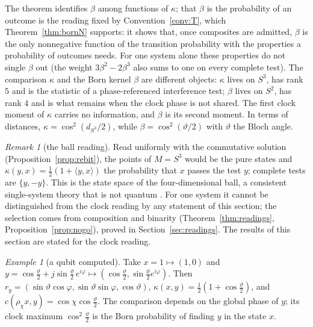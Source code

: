 \documentclass[aps,pra,onecolumn,superscriptaddress,nofootinbib,10pt]{revtex4-2}
\theoremstyle{definition}
\theoremstyle{remark}
\newtheorem{remark}[theorem]{Remark}
\newtheorem{example}[theorem]{Example}
\newcommand{\ip}[2]{\langle #1,#2\rangle}
\begin{document}
The theorem identifies $\beta$ among functions of $\kappa$; that $\beta$ is the probability of an
outcome is the reading fixed by Convention~\ref{conv:T}, which Theorem~\ref{thm:bornN} supports: it
shows that, once composites are admitted, $\beta$ is the only nonnegative function of the transition
probability with the properties a probability of outcomes needs.  For one system alone these properties do not single $\beta$ out (the weight
$3\beta^2-2\beta^3$ also sums to one on every complete test).  The comparison $\kappa$ and the Born
kernel $\beta$ are different objects: $\kappa$ lives on $S^3$, has
rank $5$ and is the statistic of a phase-referenced interference test; $\beta$ lives on $S^2$, has
rank $4$ and is what remains when the clock phase is not shared.  The first clock moment of $\kappa$
carries no information, and $\beta$ is its second moment.  In terms of distances,
$\kappa=\cos^2(d_{S^3}/2)$, while $\beta=\cos^2(\vartheta/2)$ with $\vartheta$ the Bloch angle.

\begin{remark}[the ball reading]\label{rem:ball}
Read uniformly with the commutative solution (Proposition~\ref{prop:rebit}), the points of $M=S^3$
would be the pure states and $\kappa(y,x)=\frac12(1+\ip yx)$ the probability that $x$ passes the test $y$;
complete tests are $\{y,-y\}$.  This is the state space of the four-dimensional ball, a consistent
single-system theory that is not quantum \cite{MMAP,MMPA14}.  For one system it cannot be distinguished
from the clock reading by any statement of this section; the selection comes from composition and
binarity (Theorem~\ref{thm:readings}, Proposition~\ref{prop:nogo}), proved in Section~\ref{sec:readings}.
The results of this section are stated for the clock reading.
\end{remark}

\begin{example}[a qubit computed]\label{ex:qubit}
Take $x=1\mapsto(1,0)$ and $y=\cos\tfrac\vartheta2+j\sin\tfrac\vartheta2\,e^{i\varphi}\mapsto
(\cos\tfrac\vartheta2,\sin\tfrac\vartheta2e^{i\varphi})$.  Then $r_y=(\sin\vartheta\cos\varphi,
\sin\vartheta\sin\varphi,\cos\vartheta)$, $\kappa(x,y)=\tfrac12(1+\cos\tfrac\vartheta2)$, and
$c(\rho_\chi x,y)=\cos\chi\cos\tfrac\vartheta2$.  The comparison depends on the global phase of $y$;
its clock maximum $\cos^2\frac\vartheta2$ is the Born probability of finding $y$ in the state $x$.
\end{example}
\end{document}
